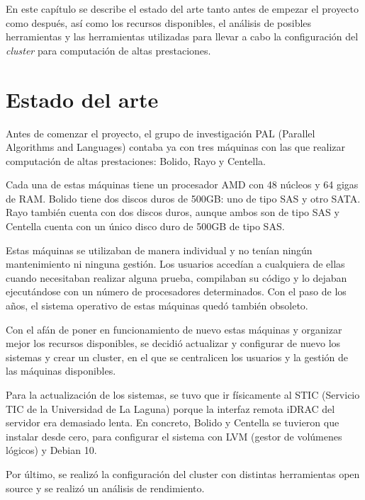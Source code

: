 En este capítulo se describe el estado del arte tanto antes de empezar el proyecto como después, así como los recursos disponibles, el análisis de posibles herramientas y las herramientas utilizadas para llevar a cabo la configuración del \emph{cluster} para computación de altas prestaciones.

\section{Estado del arte}

Antes de comenzar el proyecto, el grupo de investigación PAL (Parallel Algorithms and Languages) contaba ya con tres máquinas con las que realizar computación de altas prestaciones: Bolido, Rayo y Centella.
\vspace{2mm}

Cada una de estas máquinas tiene un procesador AMD con 48 núcleos y 64 gigas de RAM. Bolido tiene dos discos duros de 500GB: uno de tipo SAS y otro SATA. Rayo también cuenta con dos discos duros, aunque ambos son de tipo SAS y Centella cuenta con un único disco duro de 500GB de tipo SAS.
\vspace{2mm}

Estas máquinas se utilizaban de manera individual y no tenían ningún mantenimiento ni ninguna gestión. Los usuarios accedían a cualquiera de ellas cuando necesitaban realizar alguna prueba, compilaban su código y lo dejaban ejecutándose con un número de procesadores determinados. Con el paso de los años, el sistema operativo de estas máquinas quedó también obsoleto.
\vspace{2mm}
 
Con el afán de poner en funcionamiento de nuevo estas máquinas y organizar mejor los recursos disponibles, se decidió actualizar y configurar de nuevo los sistemas y crear un cluster, en el que se centralicen los usuarios y la gestión de las máquinas disponibles.
\vspace{2mm}

Para la actualización de los sistemas, se tuvo que ir físicamente al STIC (Servicio TIC de la Universidad de La Laguna) porque la interfaz remota iDRAC \cite{idrac} del servidor era demasiado lenta. En concreto, Bolido y Centella se tuvieron que instalar desde cero, para configurar el sistema con LVM (gestor de volúmenes lógicos) y Debian 10.
\vspace{2mm}

Por último, se realizó la configuración del cluster con distintas herramientas open source y se realizó un análisis de rendimiento.
\vspace{2mm}

